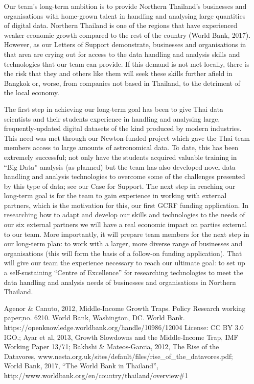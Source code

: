 \documentclass[11pt]{article}
\begin{document}
  \vspace{2mm}
  \noindent
  Our team's long-term ambition is to provide Northern Thailand's businesses and organisations with home-grown talent in handling and analysing large quantities of digital data. Northern Thailand is one of the regions that have experienced weaker economic growth compared to the rest of the country (World Bank, 2017). However, as our Letters of Support demonstrate, businesses and organisations in that area are crying out for access to the data handling and analysis skills and technologies that our team can provide. If this demand is not met locally, there is the risk that they and others like them will seek these skills further afield in Bangkok or, worse, from companies not based in Thailand, to the detriment of the local economy.
  
  \vspace{2mm}
  \noindent
  The first step in achieving our long-term goal has been to give Thai data scientists and their students experience in handling and analysing large, frequently-updated digital datasets of the kind produced by modern industries. This need was met through our Newton-funded project which gave the Thai team members access to large amounts of astronomical data. To date, this has been extremely successful; not only have the students acquired valuable training in ``Big Data'' analysis (as planned) but the team has also developed novel data handling and analysis technologies to overcome some of the challenges presented by this type of data; see our Case for Support. The next step in reaching our long-term goal is for the team to gain experience in working with external partners, which is the motivation for this, our first GCRF funding application. In researching how to adapt and develop our skills and technologies to the needs of our six external partners we will have a real economic impact on parties external to our team. More importantly, it will prepare team members for the next step in our long-term plan: to work with a larger, more diverse range of businesses and organisations (this will form the basis of a follow-on funding application). That will give our team the experience necessary to reach our ultimate goal: to set up a self-sustaining ``Centre of Excellence'' for researching technologies to meet the data handling and analysis needs of businesses and organisations in Northern Thailand.
  
  \vspace{2mm}
   {\scriptsize Agenor \& Canuto, 2012, Middle-Income Growth Traps. Policy Research working paper;no. 6210. World Bank, Washington, DC. World Bank. https://openknowledge.worldbank.org/handle/10986/12004 License: CC BY 3.0 IGO.; Ayar et al, 2013, Growth Slowdowns and the Middle-Income Trap, IMF Working Paper 13/71; Bakhshi \& Mateos-Garcia, 2012, The Rise of the Datavores, www.nesta.org.uk/sites/default/files/rise\_of\_the\_datavores.pdf; World Bank, 2017, ``The World Bank in Thailand'', http://www.worldbank.org/en/country/thailand/overview\#1}
  
  
  
  
\end{document}
